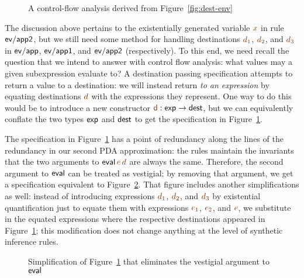 \begin{figure}[t]
\caption{A control-flow analysis derived from Figure~\ref{fig:dest-env}}
\label{fig:dest-cfa-1}
\end{figure}

The discussion above pertains to the existentially generated variable
$\lf{x}$ in rule ${\sf ev/app2}$, but we still need some method for
handling destinations $\lf{d_1}$, $\lf{d_2}$, and $\lf{d_3}$ in 
${\sf ev/app}$, ${\sf
  ev/app1}$, and ${\sf ev/app2}$ (respectively). To
this end, we need recall the question that we intend to answer with
control flow analysis: what values may a given subexpression evaluate
to? A destination passing specification attempts to return a value to
a destination: we will instead return {\it to an expression} by
equating destinations $\lf{d}$ with the expressions they represent. One way
to do this would be to introduce a new constructor $\lf{\sf d}: {\sf
  exp} \rightarrow {\sf dest}$, but we can equivalently conflate the
two types ${\sf exp}$ and ${\sf dest}$ to get the specification in
Figure~\ref{fig:dest-cfa-1}.


The specification in Figure~\ref{fig:dest-cfa-1} has a point of
redundancy along the lines of the redundancy in our second PDA
approximation: the rules maintain the invariants that the two
arguments to ${\sf eval}\,\lf{e}\,\lf{d}$ are always the same. Therefore, the
second argument to ${\sf eval}$ can be treated as vestigial; by
removing that argument, we get a specification equivalent to
Figure~\ref{fig:dest-cfa-2}. That figure includes another
simplifications as well: instead of introducing expressions $\lf{d_1}$,
$\lf{d_2}$, and $\lf{d_3}$ by existential quantification just to equate them
with expressions $\lf{e_1}$, $\lf{e_2}$, and $\lf{e}$, 
we substitute in the equated
expressions where the respective destinations appeared in
Figure~\ref{fig:dest-cfa-1}; this modification does not change
anything at the level of  synthetic inference rules.

\begin{figure}[t]
\caption{Simplification of Figure~\ref{fig:dest-cfa-1} that
  eliminates the vestigial argument to ${\sf eval}$}
\label{fig:dest-cfa-2}
\end{figure}

